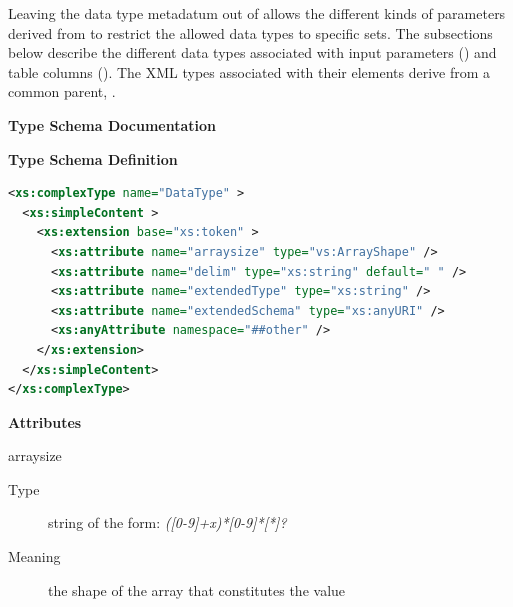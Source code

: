 \documentclass[11pt,a4paper]{ivoa}
\begin{document}

Leaving the data type metadatum out of 
allows the different kinds of parameters derived from
 to restrict the allowed data types to
specific sets.  The subsections below describe the different data
types associated with input parameters
() and table
columns ().  The
XML types associated with their  elements
derive from a common parent, .


\begin{generated}
\begingroup
      	\renewcommand*\descriptionlabel[1]{%
      	\hbox to 5.5em{\emph{#1}\hfil}}\vspace{2ex}\noindent\textbf{ Type Schema Documentation}



\vspace{1ex}\noindent\textbf{ Type Schema Definition}

\begin{lstlisting}[language=XML,basicstyle=\footnotesize]
<xs:complexType name="DataType" >
  <xs:simpleContent >
    <xs:extension base="xs:token" >
      <xs:attribute name="arraysize" type="vs:ArrayShape" />
      <xs:attribute name="delim" type="xs:string" default=" " />
      <xs:attribute name="extendedType" type="xs:string" />
      <xs:attribute name="extendedSchema" type="xs:anyURI" />
      <xs:anyAttribute namespace="##other" />
    </xs:extension>
  </xs:simpleContent>
</xs:complexType>
\end{lstlisting}

\vspace{0.5ex}\noindent\textbf{ Attributes}

\begingroup\small\begin{bigdescription}
\item[arraysize]
\begin{description}
\item[Type] string of the form: \emph{([0-9]+x)*[0-9]*[*]?}
\item[Meaning] 
                     the shape of the array that constitutes the value
                  

\end{description}
\end{bigdescription}
\end{generated}
\end{document}
